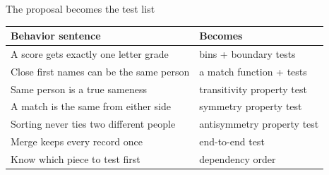 \begin{frame}{The proposal becomes the test list}
\begin{tabular}{@{}p{7.2cm}p{5.2cm}@{}}
\textbf{Behavior sentence} & \textbf{Becomes}\\\midrule
A score gets exactly one letter grade & bins + boundary tests\\
Close first names can be the same person & a match function + tests\\
Same person is a true sameness & transitivity property test\\
A match is the same from either side & symmetry property test\\
Sorting never ties two different people & antisymmetry property test\\
Merge keeps every record once & end-to-end test\\
Know which piece to test first & dependency order\\
\end{tabular}
\vspace{4pt}
\end{frame}
